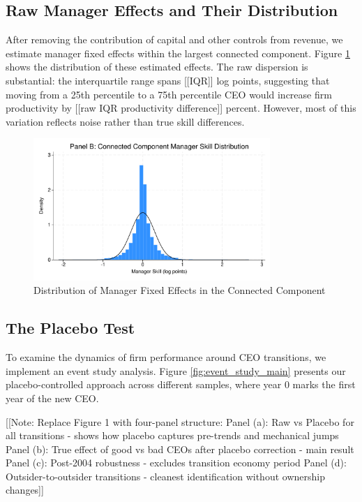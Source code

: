 \documentclass[11pt,a4paper]{article}
\begin{document}
\subsection{Raw Manager Effects and Their Distribution}

After removing the contribution of capital and other controls from revenue, we estimate manager fixed effects within the largest connected component. Figure \ref{fig:manager_distribution} shows the distribution of these estimated effects. The raw dispersion is substantial: the interquartile range spans [[IQR]] log points, suggesting that moving from a 25th percentile to a 75th percentile CEO would increase firm productivity by [[raw IQR productivity difference]] percent. However, most of this variation reflects noise rather than true skill differences.

\begin{figure}[htbp]
\centering
\includegraphics[width=0.8\textwidth]{figure/manager_skill_connected.pdf}
\caption{Distribution of Manager Fixed Effects in the Connected Component}
\label{fig:manager_distribution}
\end{figure}

\subsection{The Placebo Test}

To examine the dynamics of firm performance around CEO transitions, we implement an event study analysis. Figure \ref{fig:event_study_main} presents our placebo-controlled approach across different samples, where year 0 marks the first year of the new CEO.

[[Note: Replace Figure 1 with four-panel structure:
Panel (a): Raw vs Placebo for all transitions - shows how placebo captures pre-trends and mechanical jumps
Panel (b): True effect of good vs bad CEOs after placebo correction - main result
Panel (c): Post-2004 robustness - excludes transition economy period
Panel (d): Outsider-to-outsider transitions - cleanest identification without ownership changes]]
\end{document}
